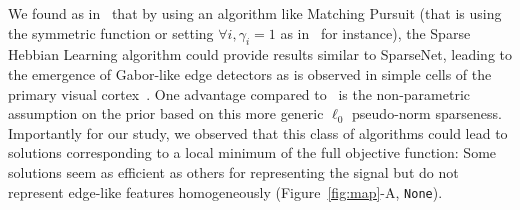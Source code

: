 \documentclass[vision,article,submit,oneauthor,pdftex]{Definitions/mdpi}
\newcommand{\coef}{\mathbf{a}} %
\newcommand{\image}{\mathbf{y}} %
\newcommand{\dico}{\Phi} %
\newcommand{\eqdef}{\ensuremath{\stackrel{\mbox{\upshape\tiny def.}}{=}}}
\newcommand{\seeFig}[1]{Figure~\ref{fig:#1}}%
\begin{document}
We found as in~\citep{Rehn07} that by using an algorithm like Matching Pursuit (that is using the symmetric function or setting $\forall i, \gamma_i=1$ as in~\citep{Mairal14} for instance), the Sparse Hebbian Learning algorithm could provide results similar to {\sc SparseNet}, leading to the emergence of Gabor-like edge detectors as is observed in simple cells of the primary visual cortex~\citep{Fischer07}. One advantage compared to~\citep{Olshausen97} is the non-parametric assumption on the prior based on this more generic $\ell_0$ pseudo-norm sparseness. Importantly for our study, we observed that this class of algorithms could lead to solutions corresponding to a local minimum of the full objective function: Some solutions seem as efficient as others for representing the signal but do not represent edge-like features homogeneously (\seeFig{map}-A, \texttt{None}). %
\end{document}
